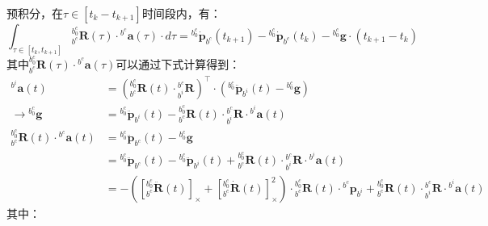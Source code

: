 \documentclass[12pt, onecolumn]{article}
\newcommand\liehat[1]{\left[ #1 \right]_\times}
\begin{document}
	预积分，在$\tau\in[t_k-t_{k+1}]$时间段内，有：
	\begin{equation}
	\int_{\tau\in[t_k,t_{k+1}]}{^{b_0^c}_{b^c}\boldsymbol{R}(\tau)}\cdot{^{b^c}\boldsymbol{a}(\tau)}\cdot d\tau=
	{^{b_0^c}\dot{\boldsymbol{p}}_{b^c}(t_{k+1})}-{^{b_0^c}\dot{\boldsymbol{p}}_{b^c}(t_k)}
	-{^{b_0^c}\boldsymbol{g}}\cdot (t_{k+1}-t_k)
	\end{equation}
	其中${^{b_0^c}_{b^c}\boldsymbol{R}(\tau)}\cdot{^{b^c}\boldsymbol{a}(\tau)}$可以通过下式计算得到：
	\begin{equation}
	\begin{aligned}
	{^{b^i}\boldsymbol{a}(t)}&=\left( {^{b^c_0}_{b^c}\boldsymbol{R}(t)}\cdot{^{b^c}_{b^i}\boldsymbol{R}}
	\right)^\top
	\cdot\left( {^{b_0^c}\ddot{\boldsymbol{p}}_{b^i}(t)}-{^{b_0^c}\boldsymbol{g}}\right)
	\\\to
	{^{b_0^c}\boldsymbol{g}}&={^{b_0^c}\ddot{\boldsymbol{p}}_{b^i}(t)}-
	{^{b^c_0}_{b^c}\boldsymbol{R}(t)}\cdot{^{b^c}_{b^i}\boldsymbol{R}}
	\cdot{^{b^i}\boldsymbol{a}(t)}
	\\
	{^{b_0^c}_{b^c}\boldsymbol{R}(t)}\cdot{^{b^c}\boldsymbol{a}(t)}&= {^{b_0^c}\ddot{\boldsymbol{p}}_{b^c}(t)}-{^{b_0^c}\boldsymbol{g}}
	\\
	&={^{b_0^c}\ddot{\boldsymbol{p}}_{b^c}(t)}-{^{b_0^c}\ddot{\boldsymbol{p}}_{b^i}(t)}+
	{^{b^c_0}_{b^c}\boldsymbol{R}(t)}\cdot{^{b^c}_{b^i}\boldsymbol{R}}
	\cdot{^{b^i}\boldsymbol{a}(t)}
	\\
	&=-\left(\liehat{{^{b^c_0}_{b^c}\ddot{\boldsymbol{R}}(t)}}
	+\liehat{{^{b^c_0}_{b^c}\dot{\boldsymbol{R}}(t)}}^2\right) \cdot{^{b^c_0}_{b^c}\boldsymbol{R}(t)}\cdot{^{b^c}\boldsymbol{p}_{b^i}}+
	{^{b^c_0}_{b^c}\boldsymbol{R}(t)}\cdot{^{b^c}_{b^i}\boldsymbol{R}}
	\cdot{^{b^i}\boldsymbol{a}(t)}
	\end{aligned}
	\end{equation}
	其中：
\end{document}
